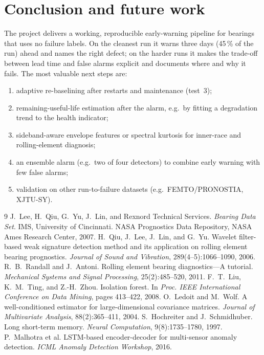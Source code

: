 \documentclass[11pt]{article}
\begin{document}
\section{Conclusion and future work}
The project delivers a working, reproducible early-warning pipeline for bearings that uses no failure
labels. On the cleanest run it warns three days (45\,\% of the run) ahead and names the right defect;
on the harder runs it makes the trade-off between lead time and false alarms explicit and documents
where and why it fails. The most valuable next steps are:
\begin{enumerate}
  \item adaptive re-baselining after restarts and maintenance (test~3);
  \item remaining-useful-life estimation after the alarm, e.g.\ by fitting a degradation trend to the
        health indicator;
  \item sideband-aware envelope features or spectral kurtosis for inner-race and rolling-element
        diagnosis;
  \item an ensemble alarm (e.g.\ two of four detectors) to combine early warning with few false alarms;
  \item validation on other run-to-failure datasets (e.g.\ FEMTO/PRONOSTIA, XJTU-SY).
\end{enumerate}

\begin{thebibliography}{9}
 J.~Lee, H.~Qiu, G.~Yu, J.~Lin, and Rexnord Technical Services.
  \emph{Bearing Data Set}. IMS, University of Cincinnati. NASA Prognostics Data Repository, NASA Ames
  Research Center, 2007.
 H.~Qiu, J.~Lee, J.~Lin, and G.~Yu. Wavelet filter-based weak signature detection
  method and its application on rolling element bearing prognostics. \emph{Journal of Sound and
  Vibration}, 289(4--5):1066--1090, 2006.
 R.~B.~Randall and J.~Antoni. Rolling element bearing diagnostics---A tutorial.
  \emph{Mechanical Systems and Signal Processing}, 25(2):485--520, 2011.
 F.~T.~Liu, K.~M.~Ting, and Z.-H.~Zhou. Isolation forest. In \emph{Proc. IEEE
  International Conference on Data Mining}, pages 413--422, 2008.
 O.~Ledoit and M.~Wolf. A well-conditioned estimator for large-dimensional
  covariance matrices. \emph{Journal of Multivariate Analysis}, 88(2):365--411, 2004.
 S.~Hochreiter and J.~Schmidhuber. Long short-term memory. \emph{Neural
  Computation}, 9(8):1735--1780, 1997.
 P.~Malhotra et al. LSTM-based encoder-decoder for multi-sensor anomaly
  detection. \emph{ICML Anomaly Detection Workshop}, 2016.
\end{thebibliography}
\end{document}
